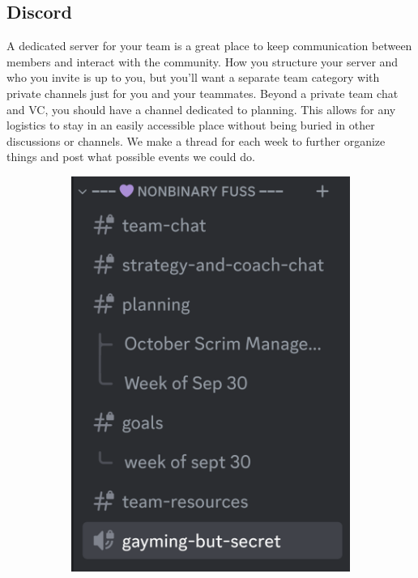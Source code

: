 \documentclass[12pt]{article}
\begin{document}
\subsection{Discord}
A dedicated server for your team is a great place to keep communication between members and interact with the community. How you structure your server and who you invite is up to you, but you'll want a separate team category with private channels just for you and your teammates. Beyond a private team chat and VC, you should have a channel dedicated to planning. This allows for any logistics to stay in an easily accessible place without being buried in other discussions or channels. We make a thread for each week to further organize things and post what possible events we could do. 
\begin{figure}[H]
\centering
\begin{subfigure}{.318\textwidth}
    \centering
    \includegraphics[width=.95\linewidth]{discord_channels.png}

\end{subfigure}
\end{figure}
\end{document}
